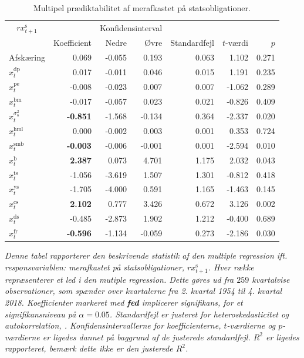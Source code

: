 \documentclass[
  a4paper,
  oneside]{memoir}
\begin{document}
\begin{table}[H]

\caption{\label{tab:MULT-s}Multipel prædiktabilitet af merafkastet på statsobligationer.}
\centering
\begin{threeparttable}
\begin{tabular}[t]{lrrrrrr}
\toprule
\multicolumn{1}{c}{$rx_{t+1}^{\text{s}}$} & \multicolumn{1}{c}{ } & \multicolumn{2}{c}{Konfidensinterval} & \multicolumn{3}{c}{ } \\
\cmidrule(l{3pt}r{3pt}){1-1} \cmidrule(l{3pt}r{3pt}){3-4}
  & Koefficient & Nedre & Øvre & Standardfejl & $t$-værdi & $p$\\
\midrule
\rowcolor{gray!6}  Afskæring & 0.069 & -0.055 & 0.193 & 0.063 & 1.102 & 0.271\\
$x_t^{\text{dp}}$ & 0.017 & -0.011 & 0.046 & 0.015 & 1.191 & 0.235\\
\rowcolor{gray!6}  $x_t^{\text{pe}}$ & -0.008 & -0.023 & 0.007 & 0.007 & -1.062 & 0.289\\
$x_t^{\text{bm}}$ & -0.017 & -0.057 & 0.023 & 0.021 & -0.826 & 0.409\\
\rowcolor{gray!6}  $x_t^{\sigma_{\text{a}}^2}$ & \textbf{-0.851} & -1.568 & -0.134 & 0.364 & -2.337 & 0.020\\
$x_t^{\text{hml}}$ & 0.000 & -0.002 & 0.003 & 0.001 & 0.353 & 0.724\\
\rowcolor{gray!6}  $x_t^{\text{smb}}$ & \textbf{-0.003} & -0.006 & -0.001 & 0.001 & -2.594 & 0.010\\
$x_t^{\text{b}}$ & \textbf{ 2.387} & 0.073 & 4.701 & 1.175 & 2.032 & 0.043\\
\rowcolor{gray!6}  $x_t^{\text{ts}}$ & -1.056 & -3.619 & 1.507 & 1.301 & -0.812 & 0.418\\
$x_t^{\text{ys}}$ & -1.705 & -4.000 & 0.591 & 1.165 & -1.463 & 0.145\\
\rowcolor{gray!6}  $x_t^{\text{cs}}$ & \textbf{ 2.102} & 0.777 & 3.426 & 0.672 & 3.126 & 0.002\\
$x_t^{\text{ds}}$ & -0.485 & -2.873 & 1.902 & 1.212 & -0.400 & 0.689\\
\rowcolor{gray!6}  $x_t^{\text{fr}}$ & \textbf{-0.596} & -1.134 & -0.059 & 0.273 & -2.186 & 0.030\\
\bottomrule
\end{tabular}
\begin{tablenotes}
\item \textit{Denne tabel rapporterer den beskrivende statistik af den multiple regression ift. responsvariablen: merafkastet på statsobligationer, $rx_{t+1}^{\text{s}}$. Hver række repræsenterer et led i den mutiple regression. Dette gøres ud fra $259$ kvartalvise observationer, som spænder over kvartalerne fra 2. kvartal 1954 til 4. kvartal 2018. Koefficienter markeret med \textbf{fed} implicerer signifikans, for et signifikansniveau på $\alpha=0.05$. Standardfejl er justeret for heteroskedasticitet og autokorrelation, \citep{Newey1987}. Konfidensintervallerne for koefficienterne, $t$-værdierne og $p$-værdierne er ligedes dannet på baggrund af de justerede standardfejl. $R^2$ er ligedes rapporteret, bemærk dette ikke er den justerede $R^2$.}

\end{tablenotes}
\end{threeparttable}
\end{table}
\end{document}
